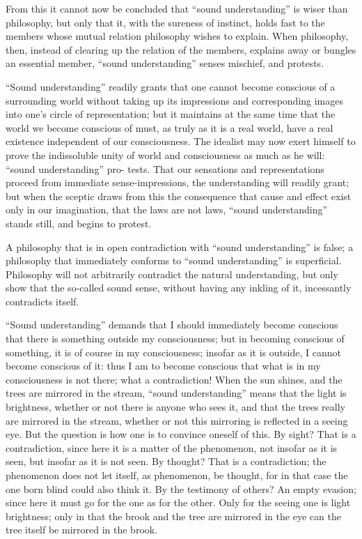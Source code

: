 \documentclass[12pt]{book}
\begin{document}
From this it cannot now be concluded that ``sound understanding'' is wiser than
philosophy, but only that it, with the sureness of instinct, holds fast to the
members whose mutual relation philosophy wishes to explain. When philosophy, then,
instead of clearing up the relation of the members, explains away or bungles an
essential member, ``sound understanding'' senses mischief, and protests.

``Sound understanding'' readily grants that one cannot become conscious of a
surrounding world without taking up its impressions and corresponding images into
one's circle of representation; but it maintains at the same time that the world we
become conscious of must, as truly as it is a real world, have a real existence
independent of our consciousness. The idealist may now exert himself to prove the
indissoluble unity of world and consciousness as much as he will: ``sound
understanding'' pro-
tests. That our sensations and representations proceed from immediate
sense-impressions, the understanding will readily grant; but when the sceptic
draws from this the consequence that cause and effect exist only in our
imagination, that the laws are not laws, ``sound understanding'' stands still, and
begins to protest.

A philosophy that is in open contradiction with ``sound understanding'' is false;
a philosophy that immediately conforms to ``sound understanding'' is superficial.
Philosophy will not arbitrarily contradict the natural understanding, but only
show that the so-called sound sense, without having any inkling of it, incessantly
contradicts itself.

``Sound understanding'' demands that I should immediately become conscious that
there is something outside my consciousness; but in becoming conscious of
something, it is of course in my consciousness; insofar as it is outside, I cannot
become conscious of it: thus I am to become conscious that what is in my
consciousness is not there; what a contradiction! When the sun shines, and the
trees are mirrored in the stream, ``sound understanding'' means that the light is
brightness, whether or not there is anyone who sees it, and that the trees really
are mirrored in the stream, whether or not this mirroring is reflected in a seeing
eye. But the question is how one is to convince oneself of this. By sight? That is
a contradiction, since here it is a matter of the phenomenon, not insofar as it is
seen, but insofar as it is not seen. By thought? That is a contradiction; the
phenomenon does not let itself, as phenomenon, be thought, for in that case the
one born blind could also think it. By the testimony of others? An empty evasion;
since here it must go for the one as for the other. Only for the seeing one is
light brightness; only in that the brook and the tree are mirrored in the eye can
the tree itself be mirrored in the brook.
\end{document}
